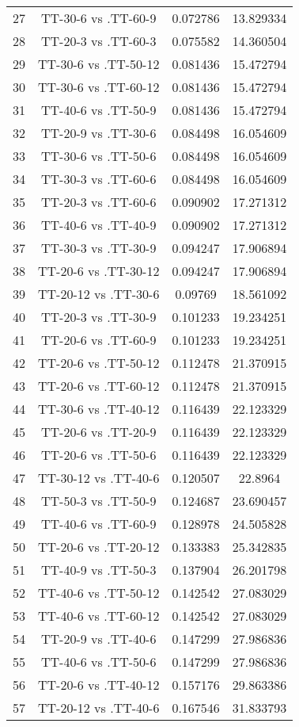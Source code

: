 \documentclass[a4paper,10pt]{article}
\begin{document}
\begin{landscape}
\begin{table}[!htp]
\begin{tabular}{cccc}
27&TT-30-6 vs .TT-60-9&0.072786&13.829334\\
28&TT-20-3 vs .TT-60-3&0.075582&14.360504\\
29&TT-30-6 vs .TT-50-12&0.081436&15.472794\\
30&TT-30-6 vs .TT-60-12&0.081436&15.472794\\
31&TT-40-6 vs .TT-50-9&0.081436&15.472794\\
32&TT-20-9 vs .TT-30-6&0.084498&16.054609\\
33&TT-30-6 vs .TT-50-6&0.084498&16.054609\\
34&TT-30-3 vs .TT-60-6&0.084498&16.054609\\
35&TT-20-3 vs .TT-60-6&0.090902&17.271312\\
36&TT-40-6 vs .TT-40-9&0.090902&17.271312\\
37&TT-30-3 vs .TT-30-9&0.094247&17.906894\\
38&TT-20-6 vs .TT-30-12&0.094247&17.906894\\
39&TT-20-12 vs .TT-30-6&0.09769&18.561092\\
40&TT-20-3 vs .TT-30-9&0.101233&19.234251\\
41&TT-20-6 vs .TT-60-9&0.101233&19.234251\\
42&TT-20-6 vs .TT-50-12&0.112478&21.370915\\
43&TT-20-6 vs .TT-60-12&0.112478&21.370915\\
44&TT-30-6 vs .TT-40-12&0.116439&22.123329\\
45&TT-20-6 vs .TT-20-9&0.116439&22.123329\\
46&TT-20-6 vs .TT-50-6&0.116439&22.123329\\
47&TT-30-12 vs .TT-40-6&0.120507&22.8964\\
48&TT-50-3 vs .TT-50-9&0.124687&23.690457\\
49&TT-40-6 vs .TT-60-9&0.128978&24.505828\\
50&TT-20-6 vs .TT-20-12&0.133383&25.342835\\
51&TT-40-9 vs .TT-50-3&0.137904&26.201798\\
52&TT-40-6 vs .TT-50-12&0.142542&27.083029\\
53&TT-40-6 vs .TT-60-12&0.142542&27.083029\\
54&TT-20-9 vs .TT-40-6&0.147299&27.986836\\
55&TT-40-6 vs .TT-50-6&0.147299&27.986836\\
56&TT-20-6 vs .TT-40-12&0.157176&29.863386\\
57&TT-20-12 vs .TT-40-6&0.167546&31.833793\\

\end{tabular}
\end{table}
\end{landscape}
\end{document}
